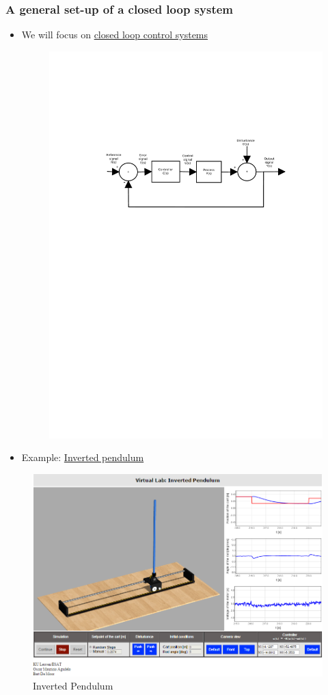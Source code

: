 \begin{frame}
	\frametitle{A general set-up of a closed loop system}
	\begin{itemize}
		\item We will focus on \underline{closed loop control systems}
		\begin{figure}
\centering
\includegraphics[width=0.7\linewidth]{Closed-Loop}
\label{fig:Closed-Loop}
\end{figure}
\item Example: \href{http://homes.esat.kuleuven.be/~magudelo/_html5/test11.html}{Inverted pendulum}
	\end{itemize}
\end{frame}

\begin{frame}
	\begin{figure}
\centering
\includegraphics[width=0.7\linewidth]{"Inverted Pendulum"}
\caption{Inverted Pendulum}
\label{fig:InvertedPendulum}
\end{figure}
\end{frame}


